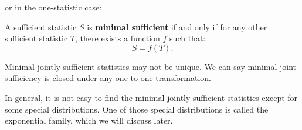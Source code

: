 \documentclass{huhtakm-template-book-v2}
\begin{document}
    or in the one-statistic case:
    \begin{defn}
        A sufficient statistic $S$ is \textbf{minimal sufficient} if and only if for any other sufficient statistic $T$, there exists a function $f$ such that:
        \begin{equation*}
            S = f(T).
        \end{equation*}
    \end{defn}
    \begin{rem}
        Minimal jointly sufficient statistics may not be unique. We can say minimal joint sufficiency is closed under any one-to-one transformation.
    \end{rem}
    In general, it is not easy to find the minimal jointly sufficient statistics except for some special distributions. One of those special distributions is called the exponential family, which we will discuss later.
    \newpage
\end{document}
